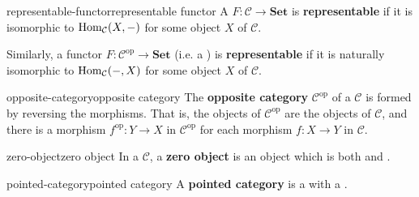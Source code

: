 \begin{topic}{representable-functor}{representable functor}
    A  $F : \mathcal{C} \to \textbf{Set}$ is \textbf{representable} if it is  isomorphic to $\text{Hom}_\mathcal{C}(X, -)$ for some object $X$ of $\mathcal{C}$.
    
    Similarly, a functor $F : \mathcal{C}^\text{op} \to \textbf{Set}$ (i.e. a ) is \textbf{representable} if it is naturally isomorphic to $\text{Hom}_\mathcal{C}(-, X)$ for some object $X$ of $\mathcal{C}$.
\end{topic}

\begin{topic}{opposite-category}{opposite category}
    The \textbf{opposite category} $\mathcal{C}^\text{op}$ of a  $\mathcal{C}$ is formed by reversing the morphisms. That is, the objects of $\mathcal{C}^\text{op}$ are the objects of $\mathcal{C}$, and there is a morphism $f^\text{op} : Y \to X$ in $\mathcal{C}^\text{op}$ for each morphism $f : X \to Y$ in $\mathcal{C}$.
\end{topic}

\begin{topic}{zero-object}{zero object}
    In a  $\mathcal{C}$, a \textbf{zero object} is an object which is both  and .
\end{topic}

\begin{topic}{pointed-category}{pointed category}
    A \textbf{pointed category} is a  with a .
\end{topic}


